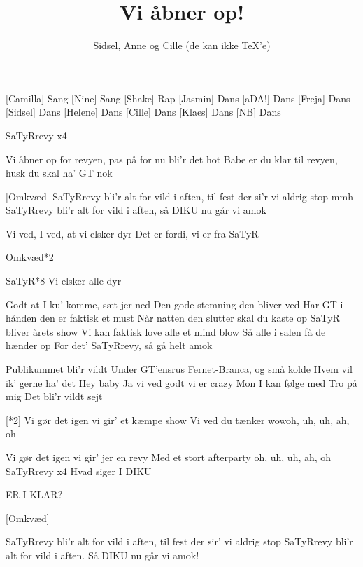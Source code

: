\documentclass[a4paper,11pt]{article}
\title{Vi åbner op!}
\author{Sidsel, Anne og Cille (de kan ikke \TeX'e)}
\begin{document}
\maketitle

\begin{roles}
    [Camilla] Sang
    [Nine] Sang
    [Shake] Rap
    [Jasmin] Dans
    [aDA!] Dans
    [Freja] Dans
    [Sidsel] Dans
    [Helene] Dans
    [Cille] Dans
    [Klaes] Dans
    [NB] Dans
\end{roles}

\begin{song}
   SaTyRrevy x4

  Vi åbner op for revyen, pas på for nu bli’r det hot
  Babe er du klar til revyen, husk du skal ha’ GT nok

 [Omkvæd] SaTyRrevy bli’r alt for vild i aften, til fest der si’r vi aldrig stop mmh
 SaTyRrevy bli’r alt for vild i aften, så DIKU nu går vi amok


 Vi ved, I ved, at vi elsker dyr
 Det er fordi, vi er fra SaTyR

 Omkvæd*2

 SaTyR*8
 Vi elsker alle dyr

 Godt at I ku’ komme, sæt jer ned
 Den gode stemning den bliver ved
 Har GT i hånden den er faktisk et must
 Når natten den slutter skal du kaste op
 SaTyR bliver årets show
 Vi kan faktisk love alle et mind blow
 Så alle i salen få de hænder op
 For det' SaTyRrevy, så gå helt amok

 Publikummet bli’r vildt
 Under GT’ensrus
 Fernet-Branca, og små kolde
 Hvem vil ik’ gerne ha’ det
 Hey baby
 Ja vi ved godt vi er crazy
 Mon I kan følge med
 Tro på mig
 Det bli’r vildt sejt

 [*2]
 Vi gør det igen vi gir’ et kæmpe show
 Vi ved du tænker wowoh, uh, uh, ah, oh

 Vi gør det igen vi gir’ jer en revy
 Med et stort afterparty oh, uh, uh, ah, oh
 SaTyRrevy x4
 Hvad siger I DIKU

 ER I KLAR?

 [Omkvæd]

  SaTyRrevy bli’r alt for vild i aften, til fest der sir’ vi aldrig stop
 SaTyRrevy bli’r alt for vild i aften. Så DIKU nu går vi amok!

\end{song}
\end{document}
